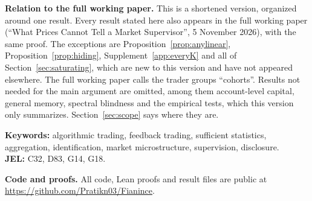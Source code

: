 \noindent\textbf{Relation to the full working paper.} This is a shortened version, organized around one result. Every result stated here also appears in the full working paper (``What Prices Cannot Tell a Market Supervisor'', 5 November 2026), with the same proof. The exceptions are Proposition~\ref{prop:anylinear}, Proposition~\ref{prop:hiding}, Supplement~\ref{app:everyK} and all of Section~\ref{sec:saturating}, which are new to this version and have not appeared elsewhere. The full working paper calls the trader groups ``co\-horts''. Results not needed for the main argument are omitted, among them account-level capital, general memory, spectral blindness and the empirical tests, which this version only summarizes. Section~\ref{sec:scope} says where they are.

\noindent\textbf{Keywords:} algorithmic trading, feedback trading, sufficient statistics, aggregation, identification, market microstructure, supervision, disclosure.\\
\textbf{JEL:} C32, D83, G14, G18.

\noindent\textbf{Code and proofs.} All code, Lean proofs and result files are public at \url{https://github.com/Pratikn03/Fianince}.

\endgroup
\newpage
\pagestyle{fancy}
\setcounter{page}{1}
